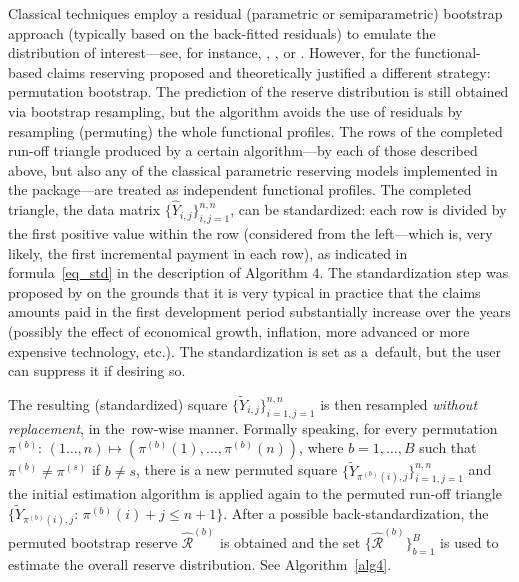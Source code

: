 Classical techniques employ a residual (parametric or semiparametric) bootstrap approach (typically based on the back-fitted residuals) to emulate the distribution of interest---see, for instance, \cite{EV1999}, \cite{P2003}, or \cite{MMP2022}. However, for the functional-based claims reserving \cite{MMP2022} proposed and theoretically justified a different strategy: permutation bootstrap. The prediction of the reserve distribution is still obtained via bootstrap resampling, but the algorithm avoids the use of residuals by resampling (permuting) the whole functional profiles. The rows of the completed run-off triangle produced by a certain algorithm---by each of those described above, but also any of the classical parametric reserving models implemented in the  package---are treated as independent functional profiles. The completed triangle, the data matrix $\{\widehat{Y}_{i,j}\}_{i,j=1}^{n,n}$, can be standardized: each row is divided by the first positive value within the row (considered from the left---which is, very likely, the first incremental payment in each row), as indicated in formula~\eqref{eq_std} in the description of Algorithm 4. The standardization step was proposed by \cite{MMP2022} on the grounds that it is very typical in practice that the claims amounts paid in the first development period substantially increase over the years (possibly the effect of economical growth, inflation, more advanced or more expensive technology, etc.). The standardization is set as a~default, but the user can suppress it if desiring so.

The resulting (standardized) square $\{\widetilde{Y}_{i,j}\}_{i=1,j=1}^{n,n}$ is then resampled \emph{without replacement}, in the~row-wise manner. Formally speaking, for every permutation
$\pi^{(b)}:\,(1\ldots,n)\mapsto(\pi^{(b)}(1),\ldots,\pi^{(b)}(n))$,
where $b=1,\ldots,B$ such that $\pi^{(b)}\neq\pi^{(s)}$ if $b\neq s$, there is a new permuted square $\{\widetilde{Y}_{\pi^{(b)}(i),j}\}_{i=1,j=1}^{n,n}$ and the initial estimation algorithm is applied again to the permuted run-off triangle $\{\widetilde{Y}_{\pi^{(b)}(i),j}:\,\pi^{(b)}(i)+j\leq n+1\}$. After a possible back-standardization, the permuted bootstrap reserve $\widehat{\mathcal{R}}^{(b)}$ is obtained and the set $\{\widehat{\mathcal{R}}^{(b)}\}_{b = 1}^{B}$ is used to estimate the overall reserve distribution. See Algorithm~\ref{alg4}. 

